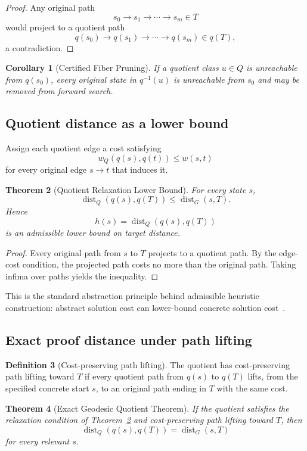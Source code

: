 \documentclass[11pt]{article}
\newtheorem{theorem}{Theorem}[section]
\newtheorem{corollary}[theorem]{Corollary}
\theoremstyle{definition}
\newtheorem{definition}[theorem]{Definition}
\theoremstyle{remark}
\newcommand{\dist}{\operatorname{dist}}
\begin{document}
\begin{proof}
Any original path
\[
s_0\to s_1\to\cdots\to s_m\in T
\]
would project to a quotient path
\[
q(s_0)\to q(s_1)\to\cdots\to q(s_m)\in q(T),
\]
a contradiction.
\end{proof}

\begin{corollary}[Certified Fiber Pruning]
If a quotient class $u\in Q$ is unreachable from $q(s_0)$, every original state in $q^{-1}(u)$ is unreachable from $s_0$ and may be removed from forward search.
\end{corollary}

\subsection{Quotient distance as a lower bound}
Assign each quotient edge a cost satisfying
\[
w_Q(q(s),q(t))\le w(s,t)
\]
for every original edge $s\to t$ that induces it.

\begin{theorem}[Quotient Relaxation Lower Bound]\label{thm:lowerbound}
For every state $s$,
\[
\dist_Q(q(s),q(T))\le\dist_G(s,T).
\]
Hence
\[
h(s)=\dist_Q(q(s),q(T))
\]
is an admissible lower bound on target distance.
\end{theorem}

\begin{proof}
Every original path from $s$ to $T$ projects to a quotient path. By the edge-cost condition, the projected path costs no more than the original path. Taking infima over paths yields the inequality.
\end{proof}

This is the standard abstraction principle behind admissible heuristic construction: abstract solution cost can lower-bound concrete solution cost~\cite{Hart1968,MostowPrieditis1989,Holte1996}.

\subsection{Exact proof distance under path lifting}
\begin{definition}[Cost-preserving path lifting]
The quotient has cost-preserving path lifting toward $T$ if every quotient path from $q(s)$ to $q(T)$ lifts, from the specified concrete start $s$, to an original path ending in $T$ with the same cost.
\end{definition}

\begin{theorem}[Exact Geodesic Quotient Theorem]
If the quotient satisfies the relaxation condition of Theorem~\ref{thm:lowerbound} and cost-preserving path lifting toward $T$, then
\[
\dist_Q(q(s),q(T))=\dist_G(s,T)
\]
for every relevant $s$.
\end{theorem}
\end{document}
